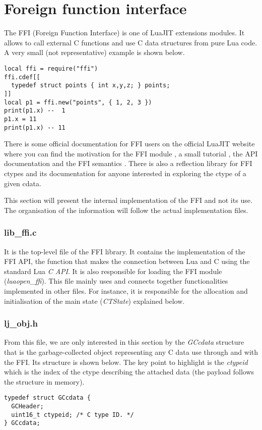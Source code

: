 \section{Foreign function interface}
\label{sec:FFI}
The FFI (Foreign Function Interface) is one of LuaJIT extensions modules. It
allows to call external C functions and use C data structures from pure Lua code.
A very small (not representative) example is shown below.

\begin{lstlisting}[style=LuaStyle]
local ffi = require("ffi")
ffi.cdef[[
  typedef struct points { int x,y,z; } points;
]]
local p1 = ffi.new("points", { 1, 2, 3 })
print(p1.x) --  1
p1.x = 11
print(p1.x) -- 11
\end{lstlisting}
There is some official documentation for FFI users on the official LuaJIT website
where you can find the motivation for the FFI module \cite{ffi-motivation},
a small tutorial \cite{ffi-tuto}, the API documentation \cite{ffi-api} and the
FFI semantics \cite{ffi-semantics}. There is also a reflection
library for FFI ctypes \cite{ffi-reflect} and its documentation
\cite{ffi-reflect-doc} for anyone interested in exploring the ctype of a given cdata.

This section will present the internal implementation of the FFI and not its use.
The organisation of the information will follow the actual implementation files.

\subsubsection{lib\_ffi.c}
It is the top-level file of the FFI library. It contains the implementation of the FFI API, the function that makes the connection between Lua and C using the standard Lua \emph{C API}. It is also responsible for loading the FFI module (\emph{luaopen\_ffi}). This file mainly uses and connects together functionalities implemented in other files. For instance, it is responsible for the allocation and initialisation of the main state (\emph{CTState}) explained below.

\subsubsection{lj\_obj.h}
From this file, we are only interested in this section by the \emph{GCcdata}
structure that is the garbage-collected object representing any C data use
through and with the FFI. Its structure is shown below. The key point to highlight is the \emph{ctypeid} which is the index of the ctype describing the
attached data (the payload follows the structure in memory).
\begin{lstlisting}[style=CStyle]
typedef struct GCcdata {
  GCHeader;
  uint16_t ctypeid;	/* C type ID. */
} GCcdata;
\end{lstlisting}

